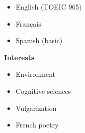\documentclass[11.5pt]{article}
\newcommand\en[1]{#1}
\newcommand\fr[1]{}
\begin{document}
\begin{minipage}[t]{\textwidth}
\begin{minipage}[t]{\cvRightWidth}
\begin{multicols}{2}
                \begin{itemize}
                    \item \fr{Anglais}\en{English} {\footnotesize(TOEIC 965)}
                    \item Français
                    \item Spanish {\footnotesize(basic)}
                \end{itemize}
            \end{multicols}
            \textbf{\fr{Intérêts}\en{Interests}}
            \begin{multicols}{2}
                \begin{itemize}
                    \fr{
                        \item Environnement
                        \item Sciences cognitives
                        \item Vulgarisation
                        \item Poésie française
                    }
                    \en{
                        \item Environment
                        \item Cognitive sciences
                        \item Vulgarization
                        \item French poetry
                    }
                \end{itemize}
            \end{multicols}
        \end{minipage}
    \end{minipage}
\end{document}
